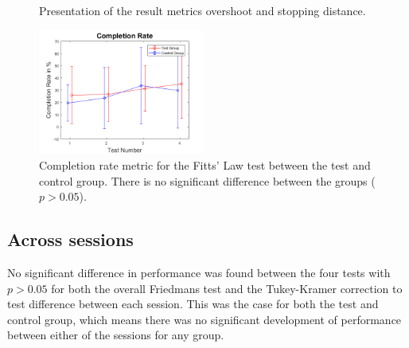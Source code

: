 \begin{figure}[H] 
	\centering
	\caption{Presentation of the result metrics overshoot and stopping distance.}
	\label{fig:resultsOS_SD}
\end{figure}

\begin{figure}[H] 
	\includegraphics[width=0.49\textwidth]{figures/xWesulds/CompletionRate}
	\caption{Completion rate metric for the Fitts' Law test between the test and control group. There is no significant difference between the groups ($p > 0.05$).}
	\label{fig:CRresult}
\end{figure} 


\subsection{Across sessions}

No significant difference in performance was found between the four tests with $p > 0.05$ for both the overall Friedmans test and the Tukey-Kramer correction to test difference between each session. This was the case for both the test and control group, which means there was no significant development of performance between either of the sessions for any group.

